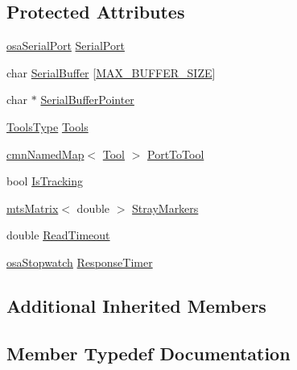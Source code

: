 \subsection*{Protected Attributes}
\begin{DoxyCompactItemize}
\item 
\hyperlink{classosa_serial_port}{osa\+Serial\+Port} \hyperlink{classmts_n_d_i_serial_a76b386e7f977b85ee1e48f7126063aa7}{Serial\+Port}
\item 
char \hyperlink{classmts_n_d_i_serial_ae5b23b322f963e10ebcc04902864eebf}{Serial\+Buffer} \mbox{[}\hyperlink{classmts_n_d_i_serial_a077c962b0ae6c53794531b1f3d632a42a5a2ba9c836a108b8648fa0887336f5cd}{M\+A\+X\+\_\+\+B\+U\+F\+F\+E\+R\+\_\+\+S\+I\+Z\+E}\mbox{]}
\item 
char $\ast$ \hyperlink{classmts_n_d_i_serial_a7017ac2bda0bd5a4aa0d8dc8e4aaf2f8}{Serial\+Buffer\+Pointer}
\item 
\hyperlink{classmts_n_d_i_serial_aa7927ca6826aae84f89df0ca800fe6bd}{Tools\+Type} \hyperlink{classmts_n_d_i_serial_adae8811079b92709d39a1818eba867c1}{Tools}
\item 
\hyperlink{classcmn_named_map}{cmn\+Named\+Map}$<$ \hyperlink{classmts_n_d_i_serial_1_1_tool}{Tool} $>$ \hyperlink{classmts_n_d_i_serial_a9e780c436ba6d57152ef11c722771034}{Port\+To\+Tool}
\item 
bool \hyperlink{classmts_n_d_i_serial_a9908b1079e158ad8d708d5ff00bd953f}{Is\+Tracking}
\item 
\hyperlink{classmts_matrix}{mts\+Matrix}$<$ double $>$ \hyperlink{classmts_n_d_i_serial_a061167330c608d025a0d6a6c9782b552}{Stray\+Markers}
\item 
double \hyperlink{classmts_n_d_i_serial_a09bb13f36457efa0528f4ca880ce1891}{Read\+Timeout}
\item 
\hyperlink{classosa_stopwatch}{osa\+Stopwatch} \hyperlink{classmts_n_d_i_serial_a78f53a7d4b1caa4fca9ee1a835ed16be}{Response\+Timer}
\end{DoxyCompactItemize}
\subsection*{Additional Inherited Members}


\subsection{Member Typedef Documentation}
\hypertarget{classmts_n_d_i_serial_aa7927ca6826aae84f89df0ca800fe6bd}{}
